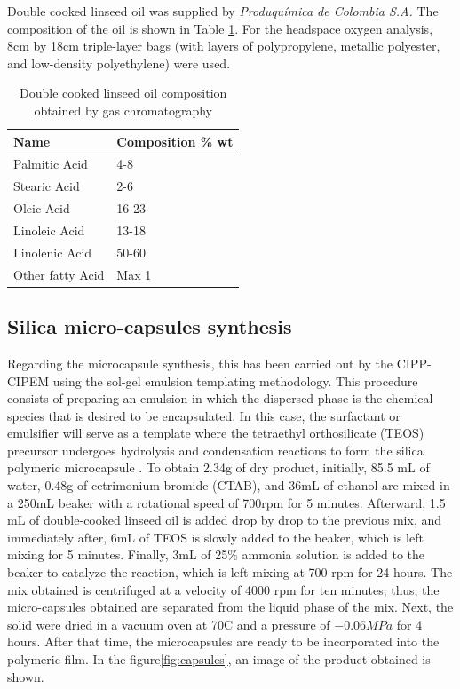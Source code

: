 \begin{refsection}
Double cooked linseed oil was supplied by \textit{Produquímica de Colombia S.A.} The composition of the oil is shown in Table \ref{tab:oil_composition}. For the headspace oxygen analysis, 8cm by 18cm triple-layer bags (with layers of polypropylene, metallic polyester, and low-density polyethylene) were used.

\begin{table}[h]
 \centering
 \caption{Double cooked linseed oil composition obtained by gas chromatography}
  \begin{tabular}[htbp]{@{}ll@{}}
    \hline
    Name & Composition \% wt\\
    \hline
    Palmitic Acid  & 4-8 \\
    Stearic Acid   & 2-6 \\
    Oleic Acid & 16-23\\
    Linoleic Acid & 13-18 \\
    Linolenic Acid & 50-60 \\
    Other fatty Acid & Max 1\\
    \hline
  \end{tabular}
  \label{tab:oil_composition}
\end{table}

\subsection{Silica micro-capsules synthesis}\label{subsec:met.sintesis}
Regarding the microcapsule synthesis, this has been carried out by the CIPP-CIPEM using the sol-gel emulsion templating methodology. This procedure consists of preparing an emulsion in which the dispersed phase is the chemical species that is desired to be encapsulated. In this case, the surfactant or emulsifier will serve as a template where the tetraethyl orthosilicate (TEOS) precursor undergoes hydrolysis and condensation reactions to form the silica polymeric microcapsule \cites{Alvarado2020ValidacionesEncapsulados}. To obtain 2.34g of dry product, initially, 85.5 mL of water, 0.48g of cetrimonium bromide (CTAB), and 36mL of ethanol are mixed in a 250mL beaker with a rotational speed of 700rpm for 5 minutes. Afterward, 1.5 mL of double-cooked linseed oil is added drop by drop to the previous mix, and immediately after, 6mL of TEOS is slowly added to the beaker, which is left mixing for 5 minutes. Finally, 3mL of 25\% ammonia solution is added to the beaker to catalyze the reaction, which is left mixing at 700 rpm for 24 hours. The mix obtained is centrifuged at a velocity of 4000 rpm for ten minutes; thus, the micro-capsules obtained are separated from the liquid phase of the mix. Next, the solid were dried in a vacuum oven at 70\degree C and a pressure of $-0.06 MPa$ for 4 hours. After that time, the microcapsules are ready to be incorporated into the polymeric film. In the figure\ref{fig:capsules}, an image of the product obtained is shown. 



\end{refsection}
